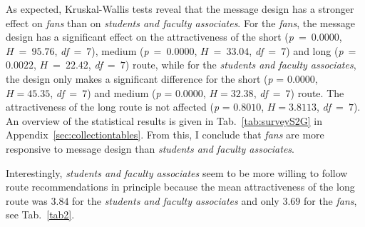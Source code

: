 As expected, Kruskal-Wallis tests reveal that the message design has a stronger effect on \textit{fans} than on \textit{students and faculty associates}. For the \textit{fans}, the message design has a significant effect on the attractiveness of the short (\textit{p}~=~$0.0000$, $H~=~95.76$, \textit{df}~=~$7$), medium (\textit{p}~=~$0.0000$, $H~=~33.04$, \textit{df}~=~$7$) and long (\textit{p}~=~$0.0022$, $H~=~22.42$, \textit{df}~=~$7$) route, while for the \textit{students and faculty associates}, the design only makes a significant difference for the short (\textit{p} = $0.0000$, $H = 45.35$, \textit{df}~=~$7$) and medium (\textit{p} = $0.0000$, $H = 32.38$, \textit{df}~=~$7$) route. The attractiveness of the long route is not affected (\textit{p} = $0.8010$, $H = 3.8113$, \textit{df}~=~$7$). An overview of the statistical results is given in Tab.~\ref{tab:surveyS2G} in Appendix~\ref{sec:collectiontables}. From this, I conclude that  \textit{fans} are more responsive to message design than \textit{students and faculty associates}.

%
Interestingly, \textit{students and faculty associates} seem to be more willing to follow route recommendations in principle because the mean attractiveness of the long route was $3.84$ for the \textit{students and faculty associates} and only $3.69$ for the \textit{fans}, see Tab.~\ref{tab2}. 

